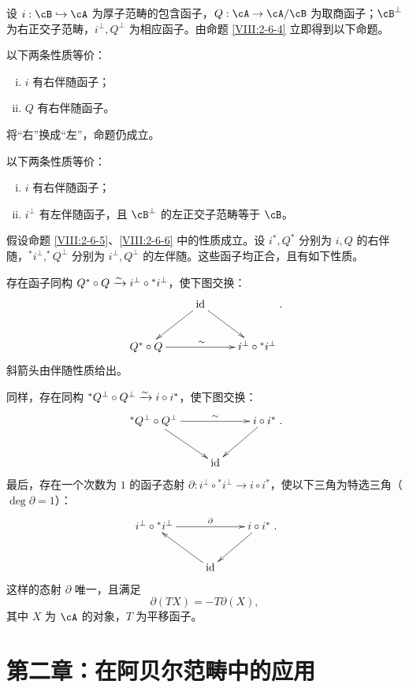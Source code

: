 设 $i:\cB\hookrightarrow\cA$ 为厚子范畴的包含函子，$Q:\cA\to\cA/\cB$ 为取商函子；$\cB^\bot$ 为右正交子范畴，$i^\bot,Q^\bot$ 为相应函子。由命题 \ref{VIII:2-6-4} 立即得到以下命题。
\begin{proposition}\label{VIII:2-6-5}
以下两条性质等价：
\begin{enumerate}[(i)]
\item $i$ 有右伴随函子；
\item $Q$ 有右伴随函子。
\end{enumerate}
\end{proposition}
将“右”换成“左”，命题仍成立。
\begin{proposition}\label{VIII:2-6-6}
以下两条性质等价：
\begin{enumerate}[(i)]
\item $i$ 有右伴随函子；
\item $i^\bot$ 有左伴随函子，且 $\cB^\bot$ 的左正交子范畴等于 $\cB$。
\end{enumerate}
\end{proposition}
\begin{proposition}\label{VIII:2-6-7}
假设命题 \ref{VIII:2-6-5}、\ref{VIII:2-6-6} 中的性质成立。设 $i^\ast,Q^\ast$ 分别为 $i,Q$ 的右伴随，$^\ast i^\bot,^\ast Q^\bot$ 分别为 $i^\bot,Q^\bot$ 的左伴随。这些函子均正合，且有如下性质。

存在函子同构 $Q^\ast\circ Q\xrightarrow\sim i^\bot\circ{}^\ast i^\bot$，使下图交换：
\[\xymatrix{&\operatorname{id}\ar[dl]\ar[dr]\\Q^\ast\circ Q\ar[rr]^\sim&&i^\bot\circ{}^\ast i^\bot}.\]
斜箭头由伴随性质给出。

同样，存在同构 $^\ast Q^\bot\circ Q^\bot\xrightarrow\sim i\circ i^\ast$，使下图交换：
\[\xymatrix{{}^\ast Q^\bot\circ Q^\bot\ar[rr]^-\sim\ar[dr]&&i\circ i^\ast\ar[dl]\\&\operatorname{id}}.\]
最后，存在一个次数为 $1$ 的函子态射 $\partial:i^\bot\circ{}^\ast i^\bot\to i\circ i^\ast$，使以下三角为特选三角（$\deg\partial=1$）：
\[\xymatrix{i^\bot\circ{}^\ast i^\bot\ar[rr]^-\partial&&i\circ i^\ast\ar[dl]\\&\operatorname{id}\ar[ul]}.\]
这样的态射 $\partial$ 唯一，且满足
\[\partial(TX)=-T\partial(X),\]
其中 $X$ 为 $\cA$ 的对象，$T$ 为平移函子。
\end{proposition}
\section*{第二章：在阿贝尔范畴中的应用}
\setcounter{section}{0}
\renewcommand{\thesubsubsection}{\arabic{subsection}.\arabic{subsubsection}}
\newtheorem{derivedcorollary}{推论}
